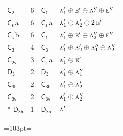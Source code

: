 \documentclass[10pt,a4paper]{article}
\newcommand{\needspace}[1]{\par\penalty-100\begingroup\dimen0=#1\relax\dimen2=\pagegoal
  \advance\dimen2-\pagetotal\ifdim\dimen0>\dimen2\relax\ifdim\dimen2>0pt\vfil\break\fi\fi
  \endgroup}
\numberwithin{equation}{section}
\newcommand{\grp}[1]{\mathsf{#1}}
\newcommand{\irr}[1]{\text{\normalfont\scshape #1}}
\newcommand{\clsletter}[1]{\,{\scriptsize\color{black!55}#1}}
\newlength{\fillwidth}\newlength{\cellwidth}\newlength{\colwidth}
\begin{document}
{\begin{longtable}{@{}lrl>{\RaggedRight\arraybackslash}p{\fillwidth}@{}}
\href{C2.pdf}{$\grp{C_{2}}$} & 6 & \href{C1.pdf}{$\grp{C_{1}}$} & $\irr{a}_{1}'\oplus \irr{e}'\oplus \irr{a}_{1}''\oplus \irr{e}''$\\
\href{C1v.pdf}{$\grp{C_{s}}$}\clsletter{a} & 6 & \href{C1v.pdf}{$\grp{C_{s}}$}\clsletter{a} & $\irr{a}_{1}'\oplus \irr{a}_{2}'\oplus 2\,\irr{e}'$\\
\href{C1v.pdf}{$\grp{C_{s}}$}\clsletter{b} & 6 & \href{C1.pdf}{$\grp{C_{1}}$} & $\irr{a}_{1}'\oplus \irr{e}'\oplus \irr{a}_{2}''\oplus \irr{e}''$\\
\href{C3.pdf}{$\grp{C_{3}}$} & 4 & \href{C3.pdf}{$\grp{C_{3}}$} & $\irr{a}_{1}'\oplus \irr{a}_{2}'\oplus \irr{a}_{1}''\oplus \irr{a}_{2}''$\\
\href{C2v.pdf}{$\grp{C_{2v}}$} & 3 & \href{C1v.pdf}{$\grp{C_{s}}$}\clsletter{a} & $\irr{a}_{1}'\oplus \irr{e}'$\\
\href{D3.pdf}{$\grp{D_{3}}$} & 2 & \href{D3.pdf}{$\grp{D_{3}}$} & $\irr{a}_{1}'\oplus \irr{a}_{1}''$\\
\href{C3h.pdf}{$\grp{C_{3h}}$} & 2 & \href{C3h.pdf}{$\grp{C_{3h}}$} & $\irr{a}_{1}'\oplus \irr{a}_{2}'$\\
\href{C3v.pdf}{$\grp{C_{3v}}$} & 2 & \href{C3v.pdf}{$\grp{C_{3v}}$} & $\irr{a}_{1}'\oplus \irr{a}_{2}''$\\*
\href{D3h.pdf}{$\grp{D_{3h}}$} & 1 & \href{D3h.pdf}{$\grp{D_{3h}}$} & $\irr{a}_{1}'$\\
\bottomrule\end{longtable}}
\needspace{103pt}
\end{document}
